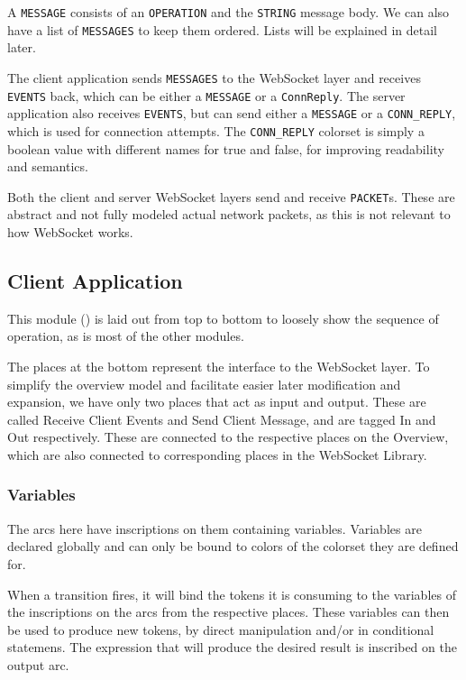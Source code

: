 	A \lstinline:MESSAGE: consists of an \lstinline:OPERATION: and the
	\lstinline:STRING: message body. We can also have a list of
	\lstinline:MESSAGES: to keep them ordered. Lists will be explained in
	detail later.
	
	The client application sends \lstinline:MESSAGES: to the WebSocket layer and
	receives \lstinline:EVENTS: back, which can be either a \lstinline:MESSAGE: or a
	\lstinline:ConnReply:. The server application also receives \lstinline:EVENTS:,
	but can send either a \lstinline:MESSAGE: or a \lstinline:CONN_REPLY:, which is
	used for connection attempts. The \lstinline:CONN_REPLY: colorset is simply a
	boolean value with different names for true and false, for improving readability
	and semantics.
	
	Both the client and server WebSocket layers send and receive
	\lstinline:PACKET:s. These are abstract and not fully modeled
	actual network packets, as this is not relevant to how WebSocket works.

\subsection{Client Application}

	
	This module () is laid out from top to bottom to loosely show
	the sequence of operation, as is most of the other modules.
	
	The places at the bottom represent the interface to the WebSocket layer. To
	simplify the overview model and facilitate easier later modification
	and expansion, we have only two places that act as input and output. These are
	called Receive Client Events and Send Client Message, and are tagged In and
	Out respectively. These are connected to the respective places on the
	Overview, which are also connected to corresponding places in the WebSocket
	Library.
	
	
	\subsubsection{Variables}
	
		The arcs here have inscriptions on them containing variables. Variables are
		declared globally and can only be bound to colors of the colorset they are
		defined for. 
		
		When a transition fires, it will bind the tokens it is consuming to the
		variables of the inscriptions on the arcs from the respective places. These
		variables can then be used to produce new tokens, by direct manipulation
		and/or in conditional statemens. The expression that will produce the desired
		result is inscribed on the output arc. 
		
